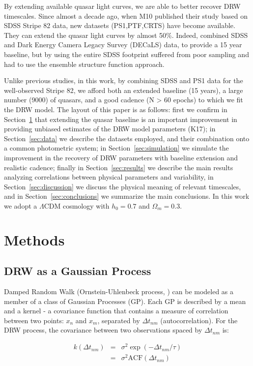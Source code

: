 \documentclass[twocolumn]{aastex62}
\begin{document}
By extending available quasar light curves, we are able to better recover DRW timescales. Since almost a decade ago, when M10 published their study based on SDSS Stripe 82 data, new datasets (PS1,PTF,CRTS) have become available. They can extend the quasar light curves by almost 50\%.  Indeed, \citet{li2018} combined SDSS and Dark Energy Camera Legacy Survey (DECaLS) data, to provide a 15 year baseline, but by using the entire SDSS footprint suffered from poor sampling and had to use the ensemble structure function approach. 


 Unlike previous studies, in this work, by combining SDSS and PS1 data for the well-observed Stripe 82, we afford both an extended baseline (15 years), a large number (9000) of quasars, and  a good cadence (N > 60 epochs) to which we fit the DRW model. The layout of this paper is as follows: first we confirm in Section~\ref{sec:methods} that extending the quasar baseline is an important improvement in providing unbiased estimates of the DRW model parameters (K17);  in Section~\ref{sec:data} we describe the datasets employed, and their combination onto a common photometric system;  in Section~\ref{sec:simulation} we simulate the improvement in the recovery of DRW parameters with baseline extension and realistic cadence; finally in Section~\ref{sec:results} we describe the main results analyzing correlations between physical parameters and variability, in Section~\ref{sec:discussion} we discuss the physical meaning of relevant timescales, and in Section~\ref{sec:conclusions} we summarize the main conclusions. In this work we adopt a $\Lambda $CDM cosmology with $h_{0} = 0.7$ and $\Omega_{m} = 0.3 $. 
%
%
%
%
\section{Methods}
\label{sec:methods}
\subsection{DRW as a Gaussian Process}
Damped Random Walk (Ornstein-Uhlenbeck process, \citealt{rasmussen2006}) can be modeled as a member of a class of Gaussian Processes (GP). Each GP is described by a mean and a kernel - a covariance function that contains a measure of correlation between two points: $x_{n}$ and $x_{m}$, separated by $\Delta t_{nm}$ (autocorrelation). For the  DRW process, the covariance  between two observations spaced by  $\Delta t_{nm}$ is: 

\begin{eqnarray}
k(\Delta t_{nm}) &=& \sigma^{2}\exp{(-\Delta t_{nm} / \tau)}  \nonumber \\
                 &=& \sigma^{2} \mathrm{ACF}(\Delta t_{nm}) 
\label{eq:covariance}
\end{eqnarray} 
\end{document}
